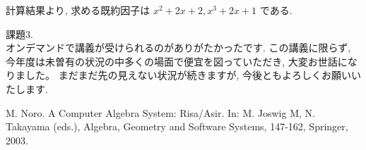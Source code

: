 \documentclass[dvipdfmx]{jsarticle}
\begin{document}
\noindent
計算結果より, 求める既約因子は $x^{2}+2x+2, x^{3}+2x+1$ である.

\noindent
課題3.\\
オンデマンドで講義が受けられるのがありがたかったです. 
この講義に限らず, 今年度は未曽有の状況の中多くの場面で便宜を図っていただき, 大変お世話になりました。
まだまだ先の見えない状況が続きますが, 今後ともよろしくお願いいたします.

\begin{thebibliography}{9}
 M. Noro. 
A Computer Algebra System: Risa/Asir. 
In: M. Joswig M, N. Takayama (eds.), Algebra, Geometry and Software Systems, 147-162,  
Springer, 2003.
\end{thebibliography}
\end{document}
